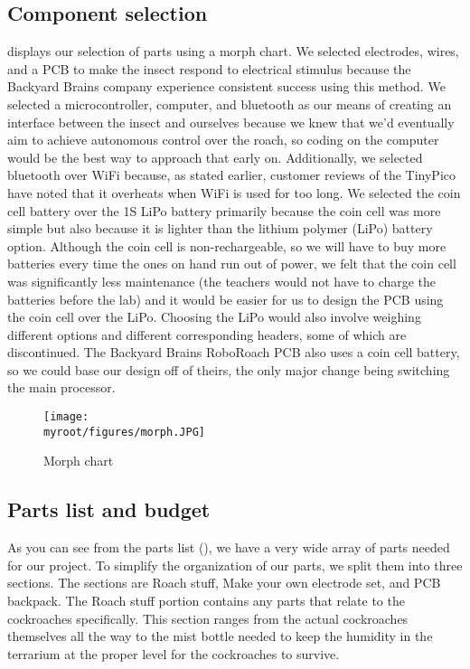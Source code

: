 \documentclass[twocolumn,10pt]{IEEEtran}
\newcommand{\myroot}{.}
\begin{document}
\subsection{Component selection}
 displays our selection of parts using a morph chart. We selected electrodes, wires, and a PCB to make the insect respond to electrical stimulus because the Backyard Brains company experience consistent success using this method. We selected a microcontroller, computer, and bluetooth as our means of creating an interface between the insect and ourselves because we knew that we'd eventually aim to achieve autonomous control over the roach, so coding on the computer would be the best way to approach that early on. Additionally, we selected bluetooth over WiFi because, as stated earlier, customer reviews of the TinyPico have noted that it overheats when WiFi is used for too long. We selected the coin cell battery over the 1S LiPo battery primarily because the coin cell was more simple but also because it is lighter than the lithium polymer (LiPo) battery option. Although the coin cell is non-rechargeable, so we will have to buy more batteries every time the ones on hand run out of power, we felt that the coin cell was significantly less maintenance (the teachers would not have to charge the batteries before the lab) and it would be easier for us to design the PCB using the coin cell over the LiPo. Choosing the LiPo would also involve weighing different options and different corresponding headers, some of which are discontinued. The Backyard Brains RoboRoach PCB also uses a coin cell battery, so we could base our design off of theirs, the only major change being switching the main processor.
\begin{figure}[ht!]
\centering
\texttt{[image: \\myroot/figures/morph.JPG]}
\caption{Morph chart}
\label{fig:morph}
\end{figure}

\subsection{Parts list and budget}
As you can see from the parts list (), we have a very wide array of parts needed for our project. To simplify the organization of our parts, we split them into three sections. The sections are Roach stuff, Make your own electrode set, and PCB backpack. The Roach stuff portion contains any parts that relate to the cockroaches specifically. This section ranges from the actual cockroaches themselves all the way to the mist bottle needed to keep the humidity in the terrarium at the proper level for the cockroaches to survive.
\end{document}
